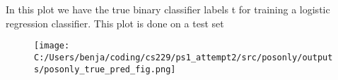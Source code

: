 %
%


\begin{answer}
In this plot we have the true binary classifier labels t for training a logistic regression classifier. This plot is done on a test set
\begin{figure}[H]
	\texttt{[image: C:/Users/benja/coding/cs229/ps1\_attempt2/src/posonly/outputs/posonly\_true\_pred\_fig.png]}
\end{figure}
	
\end{answer}
%